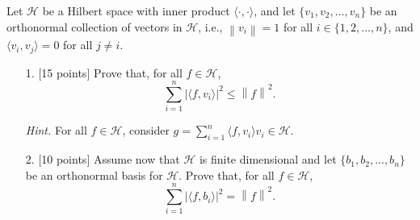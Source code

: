 \documentclass[a4paper,10.5pt]{article}
\begin{document}
Let $\mathcal{H}$ be a Hilbert space with inner product $ \langle \cdot, \cdot \rangle$, and let $\{ v_1, v_2, \ldots, v_n \}$ be an orthonormal collection of vectors in $\mathcal{H}$, i.e., $\left\| v_i \right\| = 1$ for all $i \in \{1, 2, ..., n\}$, and $\langle v_i, v_j\rangle = 0$ for all $j \neq i$.

\begin{itemize}
\item[1.] $[$15 points$]$ Prove that, for all $f \in \mathcal{H}$, 
$$ \sum_{ i=1 }^{n} | \langle  f, v_i \rangle |^2  \leq \left\| f \right\|^2.$$

\textit{Hint.} For all $f \in \mathcal{H}$, consider $g = \sum_{ i=1 }^{n} \langle f, v_i \rangle v_i \in \mathcal{H}$.

\item[2.] $[$10 points$]$ Assume now that $\mathcal{H}$ is finite dimensional and let $\{b_1, b_2, ..., b_n\}$ be an orthonormal basis for $\mathcal{H}$. Prove that, for all $f \in \mathcal{H}$,
$$ \sum_{ i=1 }^{n} | \langle  f, b_i \rangle |^2  = \left\| f \right\|^2.$$
\end{itemize}

 \\

 \\
\end{document}
